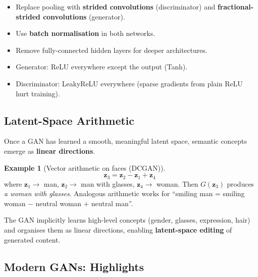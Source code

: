 \documentclass[11pt,a4paper]{article}
\theoremstyle{definition}
\newtheorem{example}{Example}[section]
\theoremstyle{plain}
\theoremstyle{remark}
\begin{document}
\begin{tcolorbox}[colback=yellow!5!white, colframe=orange!80!black, title={DCGAN architecture guidelines}]
\begin{itemize}
    \item Replace pooling with \textbf{strided convolutions} (discriminator) and \textbf{fractional-strided convolutions} (generator).
    \item Use \textbf{batch normalisation} in both networks.
    \item Remove fully-connected hidden layers for deeper architectures.
    \item Generator: ReLU everywhere except the output (Tanh).
    \item Discriminator: LeakyReLU everywhere (sparse gradients from plain ReLU hurt training).
\end{itemize}
\end{tcolorbox}

\subsection{Latent-Space Arithmetic}

Once a GAN has learned a smooth, meaningful latent space, semantic concepts emerge as \textbf{linear directions}.

\begin{example}[Vector arithmetic on faces (DCGAN)]
\[
    \mathbf{z}_3 = \mathbf{z}_2 - \mathbf{z}_1 + \mathbf{z}_4
\]
where $\mathbf{z}_1 \to$ man, $\mathbf{z}_2 \to$ man with glasses, $\mathbf{z}_4 \to$ woman. Then $G(\mathbf{z}_3)$ produces \emph{a woman with glasses}. Analogous arithmetic works for ``smiling man = smiling woman $-$ neutral woman $+$ neutral man''.
\end{example}

The GAN implicitly learns high-level concepts (gender, glasses, expression, hair) and organises them as linear directions, enabling \textbf{latent-space editing} of generated content.

\subsection{Modern GANs: Highlights}
\end{document}
